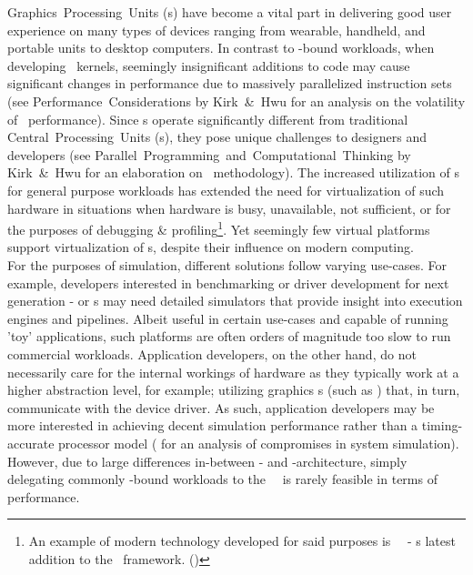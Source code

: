 \noindent
Graphics~Processing~Units (\termgpu s) have become a vital part in delivering good user experience on many types of devices ranging from wearable, handheld, and portable units to desktop computers.
In contrast to \termcpu -bound workloads, when developing \termgpu\ kernels, seemingly insignificant additions to code may cause significant changes in performance due to massively parallelized instruction sets (see Performance~Considerations by Kirk~\&~Hwu for an analysis on the volatility of \termgpu\ performance).
Since \termgpu s operate significantly different from traditional Central~Processing~Units (\termcpu s), they pose unique challenges to designers and developers (see Parallel~Programming~and~Computational~Thinking by Kirk~\&~Hwu for an elaboration on \termgpgpu\ methodology).
The increased utilization of \termgpu s for general purpose workloads has extended the need for virtualization of such hardware in situations when hardware is busy, unavailable, not sufficient, or for the purposes of debugging \& profiling\footnote{An example of modern technology developed for said purposes is \termmicrosoft ~\termwarp\ - \termmicrosoft s latest addition to the \termdirectx\ framework. ()}.
Yet seemingly few virtual platforms support virtualization of \termgpu s, despite their influence on modern computing.\\

\noindent
For the purposes of simulation, different solutions follow varying use-cases. For example, developers interested in benchmarking or driver development for next generation \termgpu - or \termcpu s may need detailed simulators that provide insight into execution engines and pipelines.
Albeit useful in certain use-cases and capable of running 'toy' applications, such platforms are often orders of magnitude too slow to run commercial workloads.
Application developers, on the other hand, do not necessarily care for the internal workings of hardware as they typically work at a higher abstraction level, for example; utilizing graphics \termapi s (such as \termopengl ) that, in turn, communicate with the device driver.
As such, application developers may be more interested in achieving decent simulation performance rather than a timing-accurate processor model ( for an analysis of compromises in system simulation).
However, due to large differences in-between \termcpu - and \termgpu -architecture, simply delegating commonly \termgpu -bound workloads to the \termhost\ \termcpu\ is rarely feasible in terms of performance.

